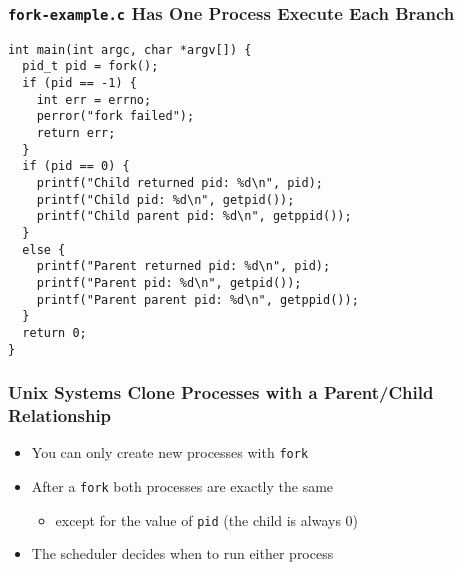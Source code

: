   \begin{frame}[fragile]
    \frametitle{\texttt{fork-example.c} Has One Process Execute Each Branch}

    \begin{lstlisting}
int main(int argc, char *argv[]) {
  pid_t pid = fork();
  if (pid == -1) {
    int err = errno;
    perror("fork failed");
    return err;
  }
  if (pid == 0) {
    printf("Child returned pid: %d\n", pid);
    printf("Child pid: %d\n", getpid());
    printf("Child parent pid: %d\n", getppid());
  }
  else {
    printf("Parent returned pid: %d\n", pid);
    printf("Parent pid: %d\n", getpid());
    printf("Parent parent pid: %d\n", getppid());
  }
  return 0;
}
    \end{lstlisting}
  \end{frame}

  \begin{frame}
    \frametitle{Unix Systems Clone Processes with a Parent/Child Relationship}

    \begin{itemize}
      \item You can only create new processes with \texttt{fork}
      \item After a \texttt{fork} both processes are exactly the same
      \begin{itemize}
        \item except for the value of \texttt{pid} (the child is always 0)
      \end{itemize}
      \item The scheduler decides when to run either process
    \end{itemize}
  \end{frame}

